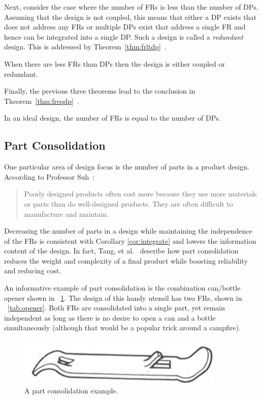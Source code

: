Next, consider the case where the number of FRs is less than the number of DPs.  Assuming that the design is not
coupled, this means that either a DP exists that does not address any FRs or multiple DPs exist that address a
single FR and hence can be integrated into a single DP.  Such a design is called a \emph{redundant} design.  This
is addressed by Theorem~\ref{thm:frltdp}~\cite{suh}.

\begin{theorem}
  \label{thm:frltdp}
  When there are less FRs than DPs then the design is either coupled or redundant.
\end{theorem}

Finally, the previous three theorems lead to the conclusion in Theorem~\ref{thm:freqdp}~\cite{suh}.

\begin{theorem}
  \label{thm:freqdp}
  In an ideal design, the number of FRs is equal to the number of DPs.
\end{theorem}

\subsection{Part Consolidation}\label{sec:sub:parts}

One particular area of design focus is the number of parts in a product design.  According to Professor
Suh~\cite{suh}:
\begin{quote}
  Poorly designed products often cost more because they use more materials or parts than do well-designed products.
  They are often difficult to manufacture and maintain.
\end{quote}
Decreasing the number of parts in a design while maintaining the independence of the FRs is consistent with
Corollary \ref{cor:integrate} and lowers the information content of the design.  In fact, Tang, et al.~\cite{tang}
describe how part consolidation reduces the weight and complexity of a final product while boosting reliability and
reducing cost.

An informative example of part consolidation is the combination can/bottle opener shown in
\figurename~\ref{fig:opener}.  The design of this handy utensil has two FRs, shown in \tablename~\ref{tab:opener}.
Both FRs are consolidated into a single part, yet remain independent as long as there is no desire to open a can
and a bottle simultaneously (although that would be a popular trick around a campfire).

\begin{figure}[H]
  \label{fig:opener}
  \begin{center}
    \includegraphics{opener}
  \end{center}
  \caption{A part consolidation example.}
\end{figure}

